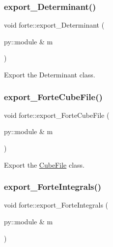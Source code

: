 \mbox{\label{namespaceforte_ae1e063749e1124563fcd7b58b570acbd}} 
\subsubsection{\texorpdfstring{export\+\_\+\+Determinant()}{export\_Determinant()}}
{\footnotesize\ttfamily void forte\+::export\+\_\+\+Determinant (\begin{DoxyParamCaption}\item[{py\+::module \&}]{m }\end{DoxyParamCaption})}



Export the Determinant class. 

\mbox{\label{namespaceforte_a646338877ef11d2794e546940f7118c2}} 
\subsubsection{\texorpdfstring{export\+\_\+\+Forte\+Cube\+File()}{export\_ForteCubeFile()}}
{\footnotesize\ttfamily void forte\+::export\+\_\+\+Forte\+Cube\+File (\begin{DoxyParamCaption}\item[{py\+::module \&}]{m }\end{DoxyParamCaption})}



Export the \mbox{\hyperlink{classforte_1_1_cube_file}{Cube\+File}} class. 

\mbox{\label{namespaceforte_aefcd99a0cde40f5fa1792e297ed6cd74}} 
\subsubsection{\texorpdfstring{export\+\_\+\+Forte\+Integrals()}{export\_ForteIntegrals()}}
{\footnotesize\ttfamily void forte\+::export\+\_\+\+Forte\+Integrals (\begin{DoxyParamCaption}\item[{py\+::module \&}]{m }\end{DoxyParamCaption})}




